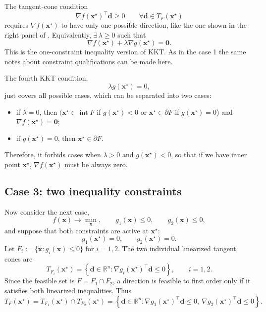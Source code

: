 The tangent-cone condition
\[
  \nabla f(\mathbf{x}^\star)^\top \mathbf{d}\ge 0
  \qquad \forall \mathbf{d}\in T_F(\mathbf{x}^\star)
\]
requires $\nabla f(\mathbf{x}^\star)$ to have only one possible direction, like
the one shown in the right panel of . Equivalently,
\(\exists\, \lambda\ge 0\) such that
\[
  \nabla f(\mathbf{x}^\star)+\lambda \nabla g(\mathbf{x}^\star)=\mathbf{0}.
\]
This is the one-constraint inequality version of KKT. As in the case 1 the same notes about 
constraint qualifications can be made here.

The fourth KKT condition,
\[
  \lambda g(\mathbf{x}^\star)=0,
\]
just covers all possible cases, which can be separated into two cases:
\begin{itemize}
  \item if $\lambda=0$, then $(\mathbf{x}^\star \in \operatorname{int} F$ if $g(\mathbf{x}^\star) <0$ or
  $\mathbf{x}^\star \in \partial F$ if $g(\mathbf{x}^\star) =0$) and
  $\nabla f(\mathbf{x}^\star)=\mathbf{0}$;
  \item if $g(\mathbf{x}^\star)=0$, then
  $\mathbf{x}^\star \in \partial F$.
\end{itemize}
Therefore, it forbids cases when $\lambda >0$  and $g(\mathbf{x}^\star) <0$, so that if we have
inner point $\mathbf{x}^{\star}$, $\nabla f(\mathbf{x}^{\star })$ must be always zero.

\subsection{Case 3: two inequality constraints}
Now consider the next case,
\[
  f(\mathbf{x}) \to \min_{\mathbf{x}},
  \qquad
  g_1(\mathbf{x})\le 0,
  \qquad
  g_2(\mathbf{x})\le 0,
\]
and suppose that both constraints are active at $\mathbf{x}^\star$:
\[
  g_1(\mathbf{x}^\star)=0,
  \qquad
  g_2(\mathbf{x}^\star)=0.
\]
Let $F_i:=\{\mathbf{x}:g_i(\mathbf{x})\le0\}$ for $i=1,2$. The two individual
linearized tangent cones are
\[
  T_{F_i}(\mathbf{x}^\star)
  =
  \left\{\mathbf{d}\in\mathbb{R}^n:
  \nabla g_i(\mathbf{x}^\star)^\top\mathbf{d}\le0\right\},
  \qquad i=1,2.
\]
Since the feasible set is $F=F_1\cap F_2$, a direction is feasible to first
order only if it satisfies both linearized inequalities. Thus
\[
  T_F(\mathbf{x}^\star)
  =
  T_{F_1}(\mathbf{x}^\star)\cap T_{F_2}(\mathbf{x}^\star)
  =
  \left\{\mathbf{d}\in\mathbb{R}^n:
  \nabla g_1(\mathbf{x}^\star)^\top\mathbf{d}\le0,\ 
  \nabla g_2(\mathbf{x}^\star)^\top\mathbf{d}\le0
  \right\}.
\]

